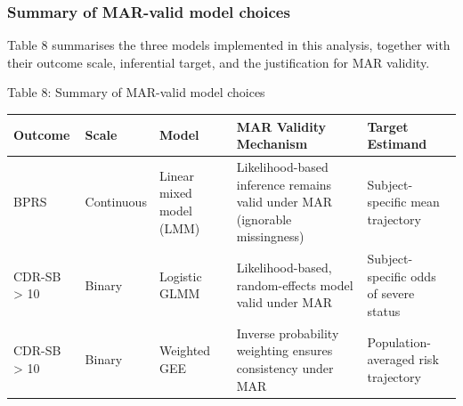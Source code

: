 \documentclass[
  9pt,
  letterpaper,
  DIV=11,
  numbers=noendperiod]{scrartcl}
\begin{document}
\subsubsection{Summary of MAR-valid model
choices}\label{summary-of-mar-valid-model-choices}

Table 8 summarises the three models implemented in this analysis,
together with their outcome scale, inferential target, and the
justification for MAR validity.

Table 8: Summary of MAR-valid model choices

\begin{longtable}[]{@{}
  >{\raggedright\arraybackslash}p{}
  >{\raggedright\arraybackslash}p{}
  >{\raggedright\arraybackslash}p{}
  >{\raggedright\arraybackslash}p{}
  >{\raggedright\arraybackslash}p{}@{}}
\toprule\noalign{}
\begin{minipage}[b]{\linewidth}\raggedright
Outcome
\end{minipage} & \begin{minipage}[b]{\linewidth}\raggedright
Scale
\end{minipage} & \begin{minipage}[b]{\linewidth}\raggedright
Model
\end{minipage} & \begin{minipage}[b]{\linewidth}\raggedright
MAR Validity Mechanism
\end{minipage} & \begin{minipage}[b]{\linewidth}\raggedright
Target Estimand
\end{minipage} \\
\midrule\noalign{}
\endhead
\bottomrule\noalign{}
\endlastfoot
BPRS & Continuous & Linear mixed model (LMM) & Likelihood-based
inference remains valid under MAR (ignorable missingness) &
Subject-specific mean trajectory \\
CDR-SB \textgreater{} 10 & Binary & Logistic GLMM & Likelihood-based,
random-effects model valid under MAR & Subject-specific odds of severe
status \\
CDR-SB \textgreater{} 10 & Binary & Weighted GEE & Inverse probability
weighting ensures consistency under MAR & Population-averaged risk
trajectory \\
\end{longtable}
\end{document}
